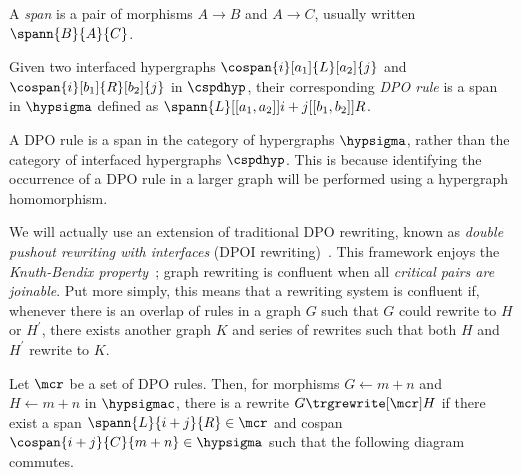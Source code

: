 \begin{definition}
    A \emph{span} is a pair of morphisms \(A \to B\) and \(A \to C\), usually
    written \(\spann{B}{A}{C}\).
\end{definition}

\begin{definition}\label{def:dpo-rule}
    Given two interfaced hypergraphs \(
    \cospan{i}[a_1]{L}[a_2]{j}
    \) and \(
    \cospan{i}[b_1]{R}[b_2]{j}
    \) in \(\cspdhyp\), their corresponding \emph{DPO rule} is a span in \(\hypsigma\)
    defined as \(
    \spann{L}[[a_1,a_2]]{i + j}[[b_1,b_2]]{R}
    \).
\end{definition}

A DPO rule is a span in the category of hypergraphs \(\hypsigma\),
rather than the category of interfaced hypergraphs \(\cspdhyp\).
This is because identifying the occurrence of a DPO rule in a larger graph will
be performed using a hypergraph homomorphism.

We will actually use an extension of traditional DPO rewriting, known as
\emph{double pushout rewriting with interfaces}
(DPOI rewriting)~\cite{bonchi2017confluence}.
This framework enjoys the \emph{Knuth-Bendix property}~\cite{knuth1970simple};
graph rewriting is confluent when all \emph{critical pairs are joinable}.
Put more simply, this means that a rewriting system is confluent if, whenever
there is an overlap of rules in a graph \(G\) such that \(G\) could rewrite to
\(H\) or \(H^\prime\), there exists another graph \(K\) and series of rewrites
such that both \(H\) and \(H^\prime\) rewrite to \(K\).

\begin{definition}\label{def:dpo-rewriting}
    Let \(\mcr\) be a set of DPO rules.
    Then, for morphisms \(G \leftarrow m + n\) and
    \(H \leftarrow m + n\) in
    \(\hypsigmac\), there is a rewrite \(G \trgrewrite[\mcr] H\) if there
    exist a span \(
    \spann{L}{i + j}{R} \in \mcr
    \) and cospan \(
    \cospan{i + j}{C}{m + n} \in \hypsigma
    \) such that the following diagram commutes.
    \begin{center}
    \end{center}
\end{definition}

